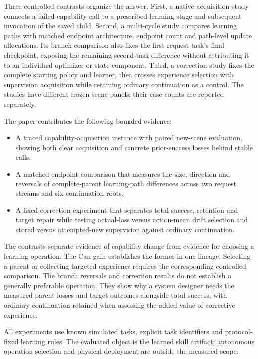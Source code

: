 \documentclass[10pt,letterpaper]{article}
\providecommand{\tightlist}{\setlength{\itemsep}{0pt}\setlength{\parskip}{0pt}}
\begin{document}
Three controlled contrasts organize the answer. First, a native
acquisition study connects a failed capability call to a prescribed
learning stage and subsequent invocation of the saved child. Second, a
multi-cycle study compares learning paths with matched endpoint
architecture, endpoint count and path-level update allocations. Its
branch comparison also fixes the first-request task's final checkpoint,
exposing the remaining second-task difference without attributing it to
an individual optimizer or state component. Third, a correction study
fixes the complete starting policy and learner, then crosses experience
selection with supervision acquisition while retaining ordinary
continuation as a control. The studies have different frozen scene
panels; their case counts are reported separately.

The paper contributes the following bounded evidence:

\begin{itemize}
\tightlist
\item
  A traced capability-acquisition instance with paired new-scene
  evaluation, showing both clear acquisition and concrete prior-success
  losses behind stable calls.
\item
  A matched-endpoint comparison that measures the size, direction and
  reversals of complete-parent learning-path differences across two
  request streams and six continuation roots.
\item
  A fixed correction experiment that separates total success, retention
  and target repair while testing actual-loss versus action-mean drift
  selection and stored versus attempted-new supervision against ordinary
  continuation.
\end{itemize}

The contrasts separate evidence of capability change from evidence for
choosing a learning operation. The Can gain establishes the former in
one lineage. Selecting a parent or collecting targeted experience
requires the corresponding controlled comparison. The branch reversals
and correction results do not establish a generally preferable
operation. They show why a system designer needs the measured parent
losses and target outcomes alongside total success, with ordinary
continuation retained when assessing the added value of corrective
experience.

All experiments use known simulated tasks, explicit task identifiers and
protocol-fixed learning rules. The evaluated object is the learned skill
artifact; autonomous operation selection and physical deployment are
outside the measured scope.
\end{document}
